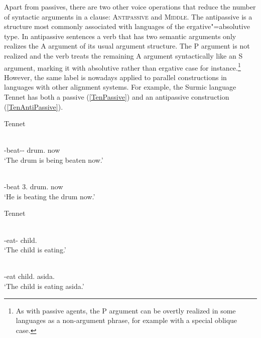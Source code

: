 Apart from passives, there are two other voice operations that reduce the number of syntactic arguments in a clause: \textsc{Antipassive} and \textsc{Middle}.
The antipassive is a structure most commonly associated with languages of the ergative"=absolutive type.
In antipassive sentences a verb that has two semantic arguments only realizes the A argument of its usual argument structure. 
The P argument is not realized and the verb treats the remaining A argument syntactically like an S argument, marking it with absolutive rather than ergative case for instance.\footnote{As with passive agents, the P argument can be overtly realized in some languages as a non-argument phrase, for example with a special oblique case.} 
However, the same label is nowadays applied to parallel constructions in languages with other alignment systems. 
For example, the Surmic language Tennet has both a passive (\ref{TenPassive}) and an antipassive construction (\ref{TenAntiPassive}).

\begin{exe}\ex\label{TenPassive} {Tennet} \citep[Surmic; Sudan;  ][245]{Randal:1998}\nopagebreak[4]

\begin{xlist}
\ex\gll{}  \\
\ipfv{}-beat-\epen{}-\pass{} drum.\nom{} now\\
`The drum is being beaten now.' 

\ex\gll{}   \\
\ipfv{}-beat 3\sg{}.\nom{} drum.\acc{} now\\
`He is beating the drum now.' 
\end{xlist}
\end{exe}

\begin{exe}\ex\label{TenAntiPassive}  {Tennet} \citep[245]{Randal:1998}\nopagebreak[4]
\begin{xlist}
\ex\gll{} \\
\ipfv{}-eat-\antip{} child.\nom{}\\
`The child is eating.' 

\ex\gll{}  \\
\ipfv{}-eat child.\nom{} asida.\acc{}\\
`The child is eating asida.' 
\end{xlist}
\end{exe}

